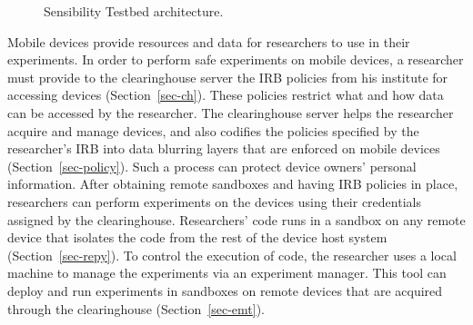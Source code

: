\begin{figure}
\caption{\small Sensibility Testbed architecture. 
\label{fig-arch}}
\end{figure}

Mobile devices
provide resources and data for researchers to use in their
experiments. In order to perform safe experiments on mobile
devices, a researcher must provide to the clearinghouse server
the IRB policies from his institute for accessing devices 
(Section~\ref{sec-ch}).  These 
policies restrict what and how data can be accessed by the 
researcher. The
clearinghouse server helps the researcher acquire and manage
devices, and also codifies the policies specified by the
researcher's IRB into data blurring layers that are enforced on
mobile devices (Section~\ref{sec-policy}). Such a process can protect device
owners' personal information. After obtaining remote sandboxes
and having IRB policies in place, researchers can perform
experiments on the devices using their credentials assigned by
the clearinghouse. Researchers' code runs in a sandbox on any
remote device that isolates the code from the rest of the device
host system (Section~\ref{sec-repy}). To control the execution of 
code, the researcher uses a local machine to manage the 
experiments via an experiment manager. This tool can deploy 
and run experiments in sandboxes on remote devices that are 
acquired through the clearinghouse (Section~\ref{sec-emt}).




